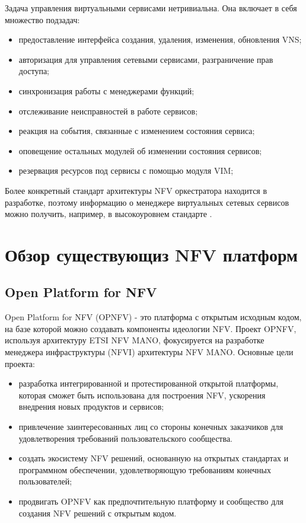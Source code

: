\documentclass[oneside,final,14pt,a4paper]{extreport}
\begin{document}
Задача управления виртуальными сервисами нетривиальна. Она включает в себя множество подзадач:

\begin{itemize}
	\item предоставление интерфейса создания, удаления, изменения, обновления VNS;
	\item авторизация для управления сетевыми сервисами, разграничение прав доступа;
	\item синхронизация работы с менеджерами функций;
	\item отслеживание неисправностей в работе сервисов;
	\item реакция на события, связанные с изменением состояния сервиса;
	\item оповещение остальных модулей об изменении состояния сервисов;
	\item резервация ресурсов под сервисы с помощью модуля VIM;
\end{itemize}

Более конкретный стандарт архитектуры NFV оркестратора находится в разработке, поэтому информацию о менеджере виртуальных сетевых сервисов можно получить, например, в высокоуровнем стандарте \cite{nfv-mano-official-2016-04}.





\chapter{Обзор существующиз NFV платформ}
\section{Open Platform for NFV}
Open Platform for NFV (OPNFV) - это платформа с открытым исходным кодом, на базе которой можно создавать компоненты  идеологии NFV. Проект OPNFV, используя архитектуру ETSI NFV MANO, фокусируется на разработке менеджера инфраструктуры (NFVI) архитектуры NFV MANO.\cite{opnfv-official}
Основные цели проекта:
\begin{itemize}
	\item разработка интегрированной и протестированной открытой платформы, которая сможет быть использована для построения NFV, ускорения внедрения новых продуктов и сервисов;
	\item привлечение заинтересованных лиц со стороны конечных заказчиков для удовлетворения требований пользовательского сообщества.
	\item создать экосистему NFV решений, основанную на открытых стандартах и программном обеспечении, удовлетворяющую требованиям конечных пользователей;
	\item продвигать OPNFV как предпочтительную платформу и сообщество для создания NFV решений с открытым кодом.
\end{itemize}
\end{document}
